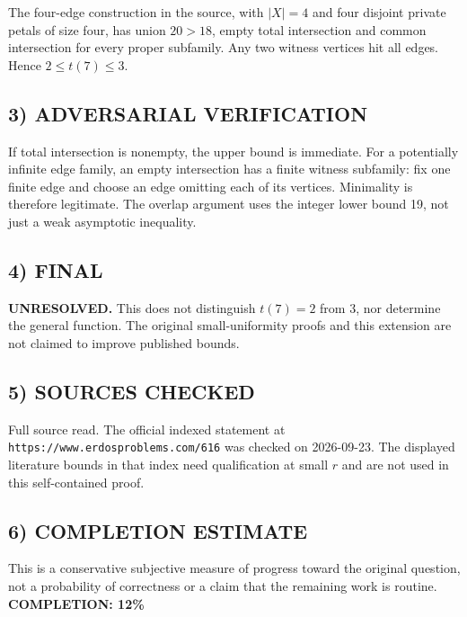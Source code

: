 The four-edge construction in the source, with $|X|=4$ and four disjoint private petals of size four, has union $20>18$, empty total intersection and common intersection for every proper subfamily. Any two witness vertices hit all edges. Hence $2\le t(7)\le3$.
\subsection{3) ADVERSARIAL VERIFICATION}
If total intersection is nonempty, the upper bound is immediate. For a potentially infinite edge family, an empty intersection has a finite witness subfamily: fix one finite edge and choose an edge omitting each of its vertices. Minimality is therefore legitimate. The overlap argument uses the integer lower bound 19, not just a weak asymptotic inequality.
\subsection{4) FINAL}
\textbf{UNRESOLVED.}
This does not distinguish $t(7)=2$ from $3$, nor determine the general function. The original small-uniformity proofs and this extension are not claimed to improve published bounds.
\subsection{5) SOURCES CHECKED}
Full source read. The official indexed statement at \texttt{https://www.erdosproblems.com/616} was checked on 2026-09-23. The displayed literature bounds in that index need qualification at small $r$ and are not used in this self-contained proof.
\subsection{6) COMPLETION ESTIMATE}
This is a conservative subjective measure of progress toward the original question, not a probability of correctness or a claim that the remaining work is routine.
\textbf{COMPLETION: 12\%}
